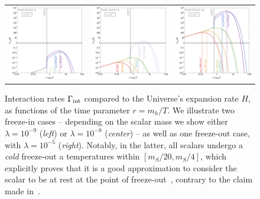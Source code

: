 \begin{figure}[t]
\begin{tabular}{lcr}\hspace{-1cm}
 \includegraphics[width=5.5cm]{figures/interactions_FreezeInLight.pdf} & \includegraphics[width=5.5cm]{figures/interactions_FreezeInHeavy.pdf} & \includegraphics[width=5.5cm]{figures/interactions_FreezeOut.pdf}
\end{tabular}
\caption{\label{fig:interaction_rates}Interaction rates $\Gamma_{\rm int}$ compared to the Universe's expansion rate $H$, as functions of the time parameter $r=m_h/T$. We illustrate two freeze-in cases -- depending on the scalar mass we show either $\lambda=10^{-9}$ (\emph{left}) or $\lambda=10^{-8}$ (\emph{center}) -- as well as one freeze-out case, with $\lambda=10^{-5}$ (\emph{right}). Notably, in the latter, all scalars undergo a \emph{cold} freeze-out a temperatures within $[m_S/20, m_S/4]$, which explicitly proves that it is a good approximation to consider the scalar to be at rest at the point of freeze-out~\cite{Merle:2014xpa}, contrary to the claim made in~\cite{Bezrukov:2014qda}.}
\end{figure}

